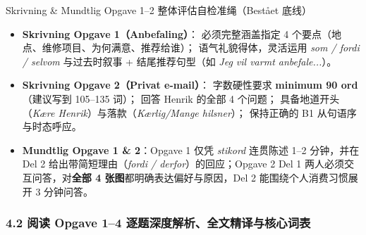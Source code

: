 \begin{tipbox}{Skrivning \& Mundtlig Opgave 1--2 整体评估自检准绳（Bestået 底线）}
\small
\begin{itemize}
  \item \textbf{Skrivning Opgave 1（Anbefaling）}： 必须完整涵盖指定 4 个要点（地点、维修项目、为何满意、推荐给谁）； 语气礼貌得体，灵活运用 \textit{som / fordi / selvom} 与过去时叙事 + 结尾推荐句型（如 \textit{Jeg vil varmt anbefale...}）。
  \item \textbf{Skrivning Opgave 2（Privat e-mail）}： 字数硬性要求 \textbf{minimum 90 ord}（建议写到 105--135 词）； 回答 Henrik 的全部 4 个问题； 具备地道开头（\textit{Kære Henrik}）与落款（\textit{Kærlig/Mange hilsner}）； 保持正确的 B1 从句语序与时态呼应。
  \item \textbf{Mundtlig Opgave 1 \& 2}：Opgave 1 仅凭 \textit{stikord} 连贯陈述 1--2 分钟，并在 Del 2 给出带简短理由（\textit{fordi / derfor}）的回应；Opgave 2 Del 1 两人必须交互问答，对\textbf{全部 4 张图}都明确表达偏好与原因，Del 2 能围绕个人消费习惯展开 3 分钟问答。
\end{itemize}
\end{tipbox}

\subsubsection*{4.2 阅读 Opgave 1--4 逐题深度解析、全文精译与核心词表}

